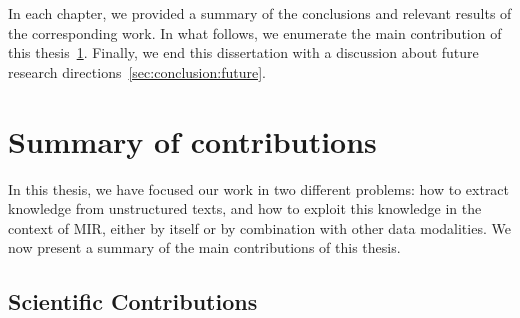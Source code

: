 In each chapter, we provided a summary of the conclusions and relevant results of the corresponding work. In what follows, we enumerate the main contribution of this thesis~\ref{sec:conclusion:summary}. Finally, we end this dissertation with a discussion about future research directions~\ref{sec:conclusion:future}.

\section{Summary of contributions}
\label{sec:conclusion:summary}

In this thesis, we have focused our work in two different problems: how to extract knowledge from unstructured texts, and how to exploit this knowledge in the context of MIR, either by itself or by combination with other data modalities. We now present a summary of the main contributions of this thesis.

\subsection{Scientific Contributions}

